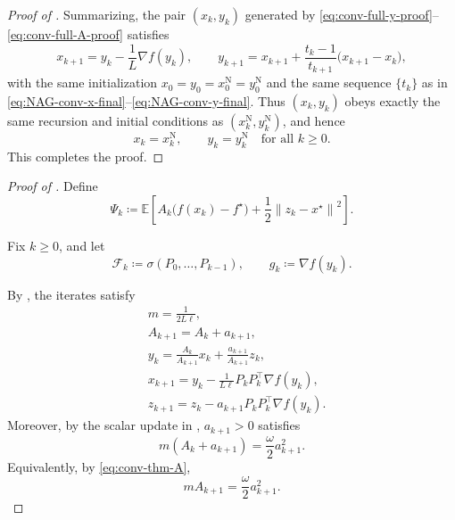 \documentclass[10pt]{article}
\newcommand{\E}{\mathbb{E}}
\newcommand{\F}{\mathcal{F}}
\newcommand{\norm}[1]{\left\|#1\right\|}
\begin{document}
\begin{proof}[Proof of ]
Summarizing, the pair $(x_k,y_k)$ generated by
\eqref{eq:conv-full-y-proof}--\eqref{eq:conv-full-A-proof} satisfies
\[
x_{k+1} = y_k - \frac{1}{L}\nabla f(y_k),
\qquad
y_{k+1} = x_{k+1} + \frac{t_k-1}{t_{k+1}}\bigl(x_{k+1}-x_k\bigr),
\]
with the same initialization $x_0=y_0=x_0^{\mathrm N}=y_0^{\mathrm N}$ and the same sequence
$\{t_k\}$ as in \eqref{eq:NAG-conv-x-final}–\eqref{eq:NAG-conv-y-final}.
Thus $(x_k,y_k)$ obeys exactly the same recursion and initial conditions as
$(x_k^{\mathrm N},y_k^{\mathrm N})$, and hence
\[
x_k = x_k^{\mathrm N},
\qquad
y_k = y_k^{\mathrm N}
\quad\text{for all }k\ge 0.
\]
This completes the proof.
\end{proof}


\begin{proof}[Proof of ]
Define
\[
\Psi_k\coloneqq\E\!\left[
A_k\bigl(f(x_k)-f^\star\bigr)
+\frac12\norm{z_k-x^\star}^2
\right].
\]

Fix \(k\ge 0\), and let
\[
\F_k\coloneqq\sigma(P_0,\dots,P_{k-1}),
\qquad
g_k\coloneqq\nabla f(y_k).
\]

By , the iterates satisfy
\begin{align}
&m = \frac{1}{2L\ell}, \label{eq:conv-thm-m}\\
&A_{k+1} = A_k+a_{k+1}, \label{eq:conv-thm-A}\\
&y_k = \frac{A_k}{A_{k+1}}x_k+\frac{a_{k+1}}{A_{k+1}}z_k, \label{eq:conv-thm-y}\\
&x_{k+1} = y_k-\frac{1}{L\ell}P_kP_k^\top \nabla f(y_k), \label{eq:conv-thm-x}\\
&z_{k+1} = z_k-a_{k+1}P_kP_k^\top \nabla f(y_k). \label{eq:conv-thm-z}
\end{align}
Moreover, by the scalar update in , \(a_{k+1}>0\) satisfies
\begin{equation}
m(A_k+a_{k+1})=\frac{\omega}{2}a_{k+1}^2.
\label{eq:conv-thm-ak}
\end{equation}
Equivalently, by \eqref{eq:conv-thm-A},
\begin{equation}
mA_{k+1}=\frac{\omega}{2}a_{k+1}^2.
\label{eq:conv-thm-akA}
\end{equation}



\end{proof}
\end{document}
